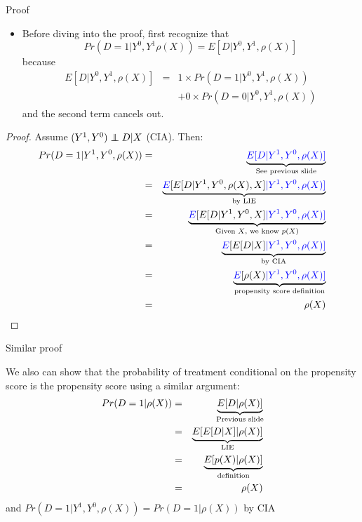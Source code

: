 \documentclass{beamer}
\newcommand\independent{\protect\mathpalette{\protect\independenT}{\perp}}
\def\independenT#1#2{\mathrel{\rlap{$#1#2$}\mkern2mu{#1#2}}}
\begin{document}
\begin{frame}{Proof}
	
	\begin{itemize}
	\item Before diving into the proof, first recognize that$$Pr(D=1|Y^0,Y^1\rho(X)) = E[D | Y^0,Y^1,\rho(X)]$$because
		\begin{eqnarray*}
		E[D|Y^0,Y^1,\rho(X)] &=& 1\times Pr(D=1|Y^0,Y^1,\rho(X)) \\
		& & + 0 \times Pr(D=0 | Y^0,Y^1,\rho(X))
		\end{eqnarray*}and the second term cancels out.
		\end{itemize}
\end{frame}

\begin{frame}[plain,shrink=5]
	
	\begin{proof}
	Assume $(Y^1,Y^0)\independent{D}|X$ (CIA).  Then:
		\begin{eqnarray*}
		Pr(D=1 | Y^1,Y^0, \rho(X)) &=& \underbrace{\textcolor{blue}{E[D | Y^1, Y^0, \rho(X)]}}_{ \mathclap{\text{See previous slide}}} \\
		&=&\underbrace{\textcolor{blue}{E} [ E [ D | Y^1,Y^0, \rho(X), X] \textcolor{blue}{| Y^1,Y^0,\rho(X)]}}_{ \mathclap{\text{by LIE}}} \\
		&=&\underbrace{\textcolor{blue}{E} [ E [ D | Y^1,Y^0,X] \textcolor{blue}{| Y^1,Y^0,\rho(X)]}}_{ \mathclap{\text{Given $X$, we know $p(X)$}}} \\
		&=&\underbrace{\textcolor{blue}{E} [E [D | X] \textcolor{blue}{| Y^1,Y^0,\rho(X)]}}_{ \mathclap{\text{by CIA}}} \\
		&=& \underbrace{\textcolor{blue}{E}[\rho(X) \textcolor{blue}{| Y^1, Y^0, \rho(X)]}}_{ \mathclap{\text{propensity score definition}}} \\
		&=& \rho(X)
		\end{eqnarray*}
	\end{proof}
	
\end{frame}

\begin{frame}{Similar proof}

	 We also can show that the probability of treatment conditional on the propensity score is the propensity score using a similar argument:
		\begin{eqnarray*}
		Pr(D=1| \rho(X)) &=& \underbrace{E[ D | \rho(X) ]}_{\mathclap{\text{Previous slide}}} \\
		&=& \underbrace{E [ E [D | X] | \rho(X)]}_{ \mathclap{\text{LIE}}} \\
		&=& \underbrace{E[p(X) | \rho(X)]}_{ \mathclap{\text{definition}}} \\
		&=& \rho(X)
		\end{eqnarray*}and $Pr(D=1 | Y^1, Y^0, \rho(X)) = Pr(D=1| \rho(X))$ by CIA
\end{frame}
\end{document}
